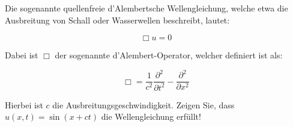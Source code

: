 Die sogenannte quellenfreie d'Alembertsche Wellengleichung, welche etwa die Ausbreitung von Schall oder Wasserwellen beschreibt, lautet:

$$\Box u = 0$$


Dabei ist $\Box$ der sogenannte d'Alembert-Operator, welcher definiert ist als:

$$\Box = \frac{1}{c^2}\frac{\partial^2}{\partial t^2} - \frac{\partial^2}{\partial x^2}$$

Hierbei ist $c$ die Ausbreitungsgeschwindigkeit. Zeigen Sie, dass $u(x,t) = \sin(x+ct)$ die Wellengleichung erfüllt!
